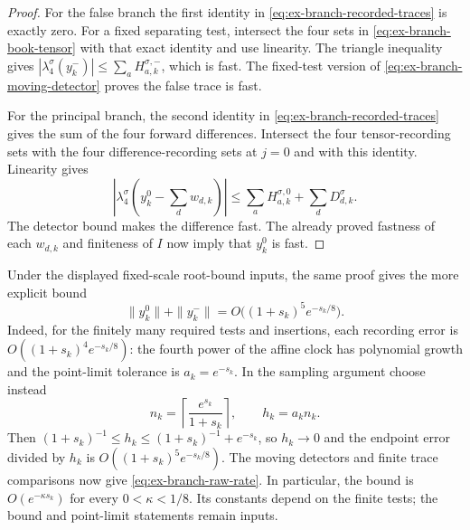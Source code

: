 \begin{proof}
For the false branch the first identity in
\eqref{eq:ex-branch-recorded-traces} is exactly zero. For a fixed separating test, intersect the four sets in
\eqref{eq:ex-branch-book-tensor} with that exact identity and use
linearity. The triangle inequality gives
$|\lambda^{\sigma}_4(y^-_k)|\le\sum_a H^{\sigma,-}_{a,k}$, which is fast. The
fixed-test version of \eqref{eq:ex-branch-moving-detector} proves the
false trace is fast.

For the principal branch, the second identity in
\eqref{eq:ex-branch-recorded-traces} gives the sum of the four forward differences. Intersect the four tensor-recording sets
with the four difference-recording sets at $j=0$ and with this identity.
Linearity gives
\[
 \left|\lambda^{\sigma}_4\left(y^0_k-\sum_d w_{d,k}\right)\right|
 \le\sum_a H^{\sigma,0}_{a,k}+\sum_dD^{\sigma}_{d,k}.
\]
The detector bound makes the difference fast. The already proved fastness
of each $w_{d,k}$ and finiteness of $I$ now imply that $y^0_k$ is fast.
\end{proof}

Under the displayed fixed-scale root-bound inputs, the same proof gives the
more explicit bound
\begin{equation}
 \|y^0_k\|+\|y^-_k\|=O\bigl((1+s_k)^5e^{-s_k/8}\bigr).
 \label{eq:ex-branch-raw-rate}
\end{equation}
Indeed, for the finitely many required tests and insertions, each recording
error is $O((1+s_k)^4e^{-s_k/8})$: the fourth power of the affine clock has
polynomial growth and the point-limit tolerance is $a_k=e^{-s_k}$. In the
sampling argument choose instead
\[
 n_k=\left\lceil\frac{e^{s_k}}{1+s_k}\right\rceil,\qquad
 h_k=a_kn_k.
\]
Then $(1+s_k)^{-1}\le h_k\le(1+s_k)^{-1}+e^{-s_k}$, so $h_k\to0$ and
the endpoint error divided by $h_k$ is
$O((1+s_k)^5e^{-s_k/8})$. The moving detectors and finite trace comparisons
now give \eqref{eq:ex-branch-raw-rate}. In particular, the bound is
$O(e^{-\kappa s_k})$ for every $0<\kappa<1/8$. Its constants depend on the
finite tests; the bound and point-limit statements remain inputs.

